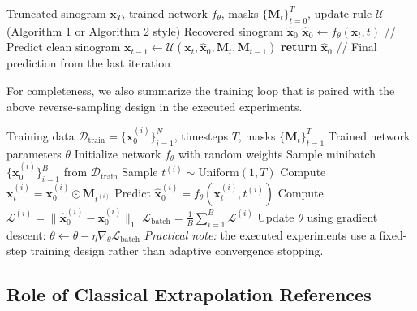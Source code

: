 \begin{algorithm}[htbp]
\caption{Cold Diffusion Sampling for Field-of-View Extension}
\label{alg:sampling}
\begin{algorithmic}[1]
\REQUIRE Truncated sinogram $\mathbf{x}_T$, trained network $f_\theta$, masks $\{\mathbf{M}_t\}_{t=0}^T$, update rule $\mathcal{U}$ (Algorithm 1 or Algorithm 2 style)
\ENSURE Recovered sinogram $\hat{\mathbf{x}}_0$
    \STATE $\hat{\mathbf{x}}_0 \gets f_\theta(\mathbf{x}_t, t)$ \hfill // Predict clean sinogram
    \STATE $\mathbf{x}_{t-1} \gets \mathcal{U}(\mathbf{x}_t, \hat{\mathbf{x}}_0, \mathbf{M}_{t}, \mathbf{M}_{t-1})$
\ENDFOR
\STATE \textbf{return} $\hat{\mathbf{x}}_0$ \hfill // Final prediction from the last iteration
\end{algorithmic}
\end{algorithm}

For completeness, we also summarize the training loop that is paired with the above reverse-sampling design in the executed experiments.

\begin{algorithm}[htbp]
\caption{Training Cold Diffusion for Field-of-View Extension}
\label{alg:training}
\begin{algorithmic}[1]
\REQUIRE Training data $\mathcal{D}_{\text{train}} = \{\mathbf{x}_0^{(i)}\}_{i=1}^N$, timesteps $T$, masks $\{\mathbf{M}_t\}_{t=1}^T$
\ENSURE Trained network parameters $\theta$
\STATE Initialize network $f_\theta$ with random weights
    \STATE Sample minibatch $\{\mathbf{x}_0^{(i)}\}_{i=1}^B$ from $\mathcal{D}_{\text{train}}$
        \STATE Sample $t^{(i)} \sim \text{Uniform}(1, T)$
        \STATE Compute $\mathbf{x}_t^{(i)} = \mathbf{x}_0^{(i)} \odot \mathbf{M}_{t^{(i)}}$
        \STATE Predict $\hat{\mathbf{x}}_0^{(i)} = f_\theta(\mathbf{x}_t^{(i)}, t^{(i)})$
        \STATE Compute $\mathcal{L}^{(i)} = \| \hat{\mathbf{x}}_0^{(i)} - \mathbf{x}_0^{(i)} \|_1$
    \ENDFOR
    \STATE $\mathcal{L}_{\text{batch}} = \frac{1}{B} \sum_{i=1}^B \mathcal{L}^{(i)}$
    \STATE Update $\theta$ using gradient descent: $\theta \gets \theta - \eta \nabla_\theta \mathcal{L}_{\text{batch}}$
\ENDWHILE
\STATE \textit{Practical note:} the executed experiments use a fixed-step training design rather than adaptive convergence stopping.
\end{algorithmic}
\end{algorithm}

\subsection{Role of Classical Extrapolation References}

